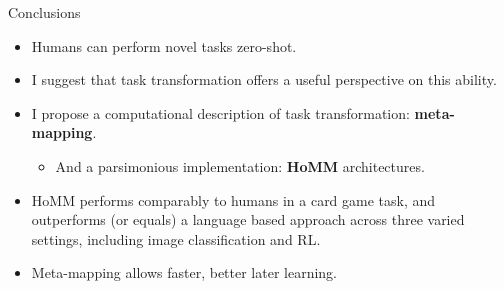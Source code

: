 \documentclass{beamer}
\begin{document}
%
%



\begin{frame}{Conclusions}

\begin{itemize}
\item Humans can perform novel tasks zero-shot. 
\item I suggest that task transformation offers a useful perspective on this ability. 
\item I propose a computational description of task transformation: \textbf{meta-mapping}.
    \begin{itemize}
        \item And a parsimonious implementation: \textbf{HoMM} architectures. 
    \end{itemize}
\item HoMM performs comparably to humans in a card game task, and outperforms (or equals) a language based approach across three varied settings, including image classification and RL.
\item Meta-mapping allows faster, better later learning. 
\end{itemize}
\end{frame}
\end{document}
